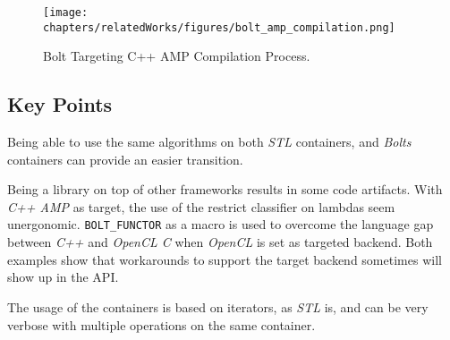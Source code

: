 \begin{figure}
\center
\texttt{[image: chapters/relatedWorks/figures/bolt\_amp\_compilation.png]}
\caption{Bolt Targeting C++ AMP Compilation Process.}
\label{fig:boltAmpCompilation}
\end{figure}

\subsection{Key Points}
Being able to use the same algorithms on both \textit{STL} containers, and \textit{Bolts} containers can provide an easier transition.

Being a library on top of other frameworks results in some code artifacts. With \textit{C++ AMP} as target, the use of the restrict classifier on lambdas seem unergonomic. \texttt{BOLT\_FUNCTOR} as a macro is used to overcome the language gap between \textit{C++} and \textit{OpenCL C} when \textit{OpenCL} is set as targeted backend. Both examples show that workarounds to support the target backend sometimes will show up in the API. 

The usage of the containers is based on iterators, as \textit{STL} is, and can be very verbose with multiple operations on the same container.
